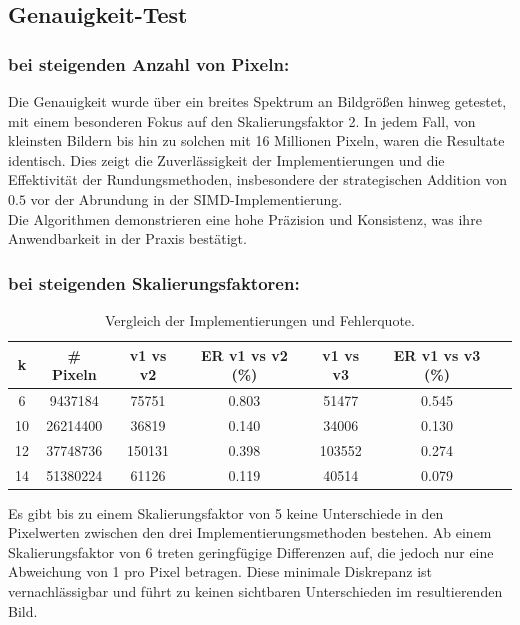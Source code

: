 \documentclass[course=erap]{aspdoc}
\begin{document}
\subsection{Genauigkeit-Test}
\subsubsection{bei steigenden Anzahl von Pixeln:}
Die Genauigkeit wurde über ein breites Spektrum an Bildgrößen hinweg getestet, mit einem besonderen Fokus auf den Skalierungsfaktor 2. In jedem Fall, von kleinsten Bildern bis hin zu solchen mit 16 Millionen Pixeln, waren die Resultate identisch. Dies zeigt die Zuverlässigkeit der Implementierungen und die Effektivität der Rundungsmethoden, insbesondere der strategischen Addition von $0.5$ vor der Abrundung in der SIMD-Implementierung.\\
Die Algorithmen demonstrieren eine hohe Präzision und Konsistenz, was ihre Anwendbarkeit in der Praxis bestätigt.\\


\subsubsection{bei steigenden Skalierungsfaktoren:}

\begin{table}[ht]
\centering
\begin{tabular}{|c|c|c|c|c|c|c|}
\hline
k & \# Pixeln & v1 vs v2 & ER v1 vs v2 (\%) & v1 vs v3 & ER v1 vs v3 (\%)  \\ 
\hline
6 & 9437184 & 75751 & 0.803 & 51477 & 0.545  \\
10 & 26214400 & 36819 & 0.140 & 34006 & 0.130  \\
12 & 37748736 & 150131 & 0.398 & 103552 & 0.274  \\
14 & 51380224 & 61126 & 0.119 & 40514 & 0.079  \\
\hline
\end{tabular}
\caption{Vergleich der Implementierungen und Fehlerquote.}
\label{tab:comparison}
\end{table}

Es gibt bis zu einem Skalierungsfaktor von 5 keine Unterschiede in den Pixelwerten zwischen den drei Implementierungsmethoden bestehen. Ab einem Skalierungsfaktor von 6 treten geringfügige Differenzen auf, die jedoch nur eine Abweichung von 1 pro Pixel betragen. Diese minimale Diskrepanz ist vernachlässigbar und führt zu keinen sichtbaren Unterschieden im resultierenden Bild.
\end{document}
